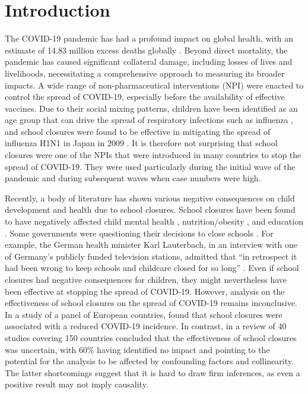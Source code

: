 \documentclass[Harvard,Times1COL]{WileyNJDv5}
\begin{document}
{

\maketitle
\section{Introduction}\label{introduction}

The COVID-19 pandemic has had a profound impact on global health, with
an estimate of 14.83 million excess deaths globally
\citep{msemburi2023estimates}. Beyond direct mortality, the pandemic has
caused significant collateral damage, including losses of lives and
livelihoods, necessitating a comprehensive approach to measuring its
broader impacts. A wide range of non-pharmaceutical interventions (NPI)
were enacted to control the spread of COVID-19, especially before the
availability of effective vaccines. Due to their social mixing patterns,
children have been identified as an age group that can drive the spread
of respiratory infections such as influenza \citep{moser2018estimating},
and school closures were found to be effective in mitigating the spread
of influenza H1N1 in Japan in 2009 \citep{kawano2015substantial}. It is
therefore not surprising that school closures were one of the NPIs that
were introduced in many countries to stop the spread of COVID-19. They
were used particularly during the initial wave of the pandemic and
during subsequent waves when case numbers were high.

Recently, a body of literature has shown various negative consequences
on child development and health due to school closures. School closures
have been found to have negatively affected child mental health
\citep{moulin2022longitudinal}, nutrition/obesity
\citep{sugimoto2023temporal}, and education
\citep{lerkkanen2023reading}. Some governments were questioning their
decisions to close schools \citep{de2021determines}. For example, the
German health minister Karl Lauterbach, in an interview with one of
Germany's publicly funded television stations, admitted that ``in
retrospect it had been wrong to keep schools and childcare closed for so
long'' \citep{ard2023lauterbach}. Even if school closures had negative
consequences for children, they might nevertheless have been effective
at stopping the spread of COVID-19. However, analysis on the
effectiveness of school closures on the spread of COVID-19 remains
inconclusive. In a study of a panel of European countries,
\citet{alfano2022effects} found that school closures were associated
with a reduced COVID-19 incidence. In contrast, \citet{walsh2021school}
in a review of 40 studies covering 150 countries concluded that the
effectiveness of school closures was uncertain, with 60\% having
identified no impact and pointing to the potential for the analysis to
be affected by confounding factors and collinearity. The latter
shortcomings suggest that it is hard to draw firm inferences, as even a
positive result may not imply causality.

}
\end{document}
